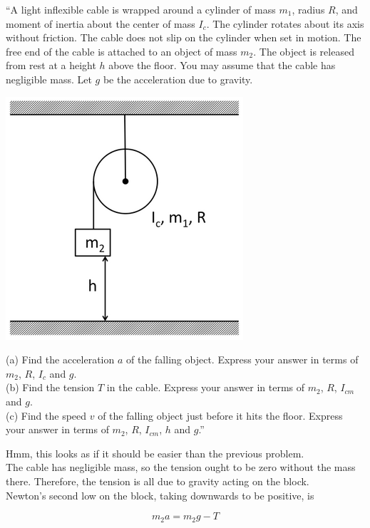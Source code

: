 \documentclass[12pt,a4paper]{report}
\begin{document}
``A light inflexible cable is wrapped around a cylinder of mass $m_1$, radius $R$, and moment of inertia about the center of mass $I_c$. The cylinder rotates about its axis without friction. The cable does not slip on the cylinder when set in motion. The free end of the cable is attached to an object of mass $m_2$. The object is released from rest at a height $h$ above the floor. You may assume that the cable has negligible mass. Let $g$ be the acceleration due to gravity.

\begin{center}
\includegraphics[scale=0.65]{Graphics/h7p4}
\end{center}

(a) Find the acceleration $a$ of the falling object. Express your answer in terms of $m_2$, $R$, $I_c$ and $g$.\\
(b) Find the tension $T$ in the cable. Express your answer in terms of $m_2$, $R$, $I_{cm}$ and $g$.\\
(c) Find the speed $v$ of the falling object just before it hits the floor. Express your answer in terms of $m_2$, $R$, $I_{cm}$, $h$ and $g$.''

Hmm, this looks as if it should be easier than the previous problem.\\
The cable has negligible mass, so the tension ought to be zero without the mass there. Therefore, the tension is all due to gravity acting on the block.\\
Newton's second low on the block, taking downwards to be positive, is

\begin{equation}
m_2 a = m_2 g - T
\end{equation}
\end{document}
